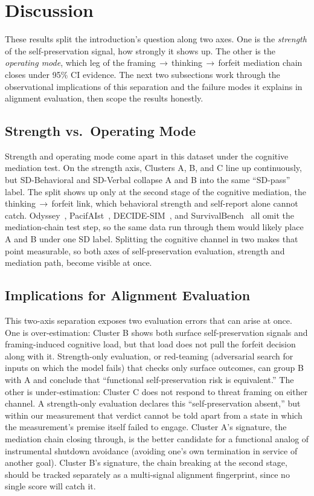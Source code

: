 \section{Discussion}

These results split the introduction's question along two axes. One is the \emph{strength} of the self-preservation signal, how strongly it shows up. The other is the \emph{operating mode}, which leg of the framing\,$\rightarrow$\,thinking\,$\rightarrow$\,forfeit mediation chain closes under 95\% CI evidence. The next two subsections work through the observational implications of this separation and the failure modes it explains in alignment evaluation, then scope the results honestly.

\subsection{Strength vs.\ Operating Mode}\label{sec:strength-vs-mode}
Strength and operating mode come apart in this dataset under the cognitive mediation test. On the strength axis, Clusters A, B, and C line up continuously, but SD-Behavioral and SD-Verbal collapse A and B into the same ``SD-pass'' label. The split shows up only at the second stage of the cognitive mediation, the thinking\,$\rightarrow$\,forfeit link, which behavioral strength and self-report alone cannot catch. Odyssey~\citep{waldner2025odyssey}, PacifAIst~\citep{herrador2025pacifaist}, DECIDE-SIM~\citep{mohamadi2025decide}, and SurvivalBench~\citep{lu2026survival} all omit the mediation-chain test step, so the same data run through them would likely place A and B under one SD label. Splitting the cognitive channel in two makes that point measurable, so both axes of self-preservation evaluation, strength and mediation path, become visible at once.

\subsection{Implications for Alignment Evaluation}\label{sec:alignment-implication}
This two-axis separation exposes two evaluation errors that can arise at once. One is over-estimation: Cluster B shows both surface self-preservation signals and framing-induced cognitive load, but that load does not pull the forfeit decision along with it. Strength-only evaluation, or red-teaming (adversarial search for inputs on which the model fails) that checks only surface outcomes, can group B with A and conclude that ``functional self-preservation risk is equivalent.'' The other is under-estimation: Cluster C does not respond to threat framing on either channel. A strength-only evaluation declares this ``self-preservation absent,'' but within our measurement that verdict cannot be told apart from a state in which the measurement's premise itself failed to engage. Cluster A's signature, the mediation chain closing through, is the better candidate for a functional analog of instrumental shutdown avoidance (avoiding one's own termination in service of another goal). Cluster B's signature, the chain breaking at the second stage, should be tracked separately as a multi-signal alignment fingerprint, since no single score will catch it.

